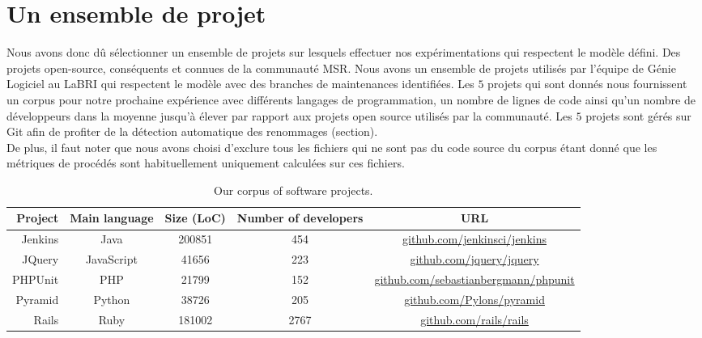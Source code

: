 \section{Un ensemble de projet}
\label{sec:ensemble_projet}
Nous avons donc dû sélectionner un ensemble de projets sur lesquels effectuer nos expérimentations qui respectent le modèle défini. Des projets open-source, conséquents et connues de la communauté MSR. Nous avons un ensemble de projets utilisés par l'équipe de Génie Logiciel au LaBRI qui respectent le modèle avec des branches de maintenances identifiées. Les $5$ projets qui sont donnés  nous fournissent un corpus pour notre prochaine expérience avec différents langages de programmation, un nombre de lignes de code ainsi qu'un nombre de développeurs dans la moyenne jusqu'à élever par rapport aux projets open source utilisés par la communauté. Les $5$ projets sont gérés sur Git afin de profiter de la détection automatique des renommages (section). \\
De plus, il faut noter que nous avons choisi d'exclure tous les fichiers qui ne sont pas du code source du corpus étant donné que les métriques de procédés sont habituellement uniquement calculées sur ces fichiers. \\

\begin{table*}[t]
\centering
\begin{tabular}{rcccc}
\toprule
Project & Main language & Size (LoC) & Number of developers & URL\\
\midrule
Jenkins & Java & 200851 & 454 & \url{github.com/jenkinsci/jenkins} \\
JQuery & JavaScript & 41656 & 223 & \url{github.com/jquery/jquery} \\
PHPUnit & PHP & 21799 & 152 & \url{github.com/sebastianbergmann/phpunit}\\
Pyramid & Python & 38726 & 205 & \url{github.com/Pylons/pyramid} \\
Rails & Ruby & 181002 & 2767 & \url{github.com/rails/rails}\\
\bottomrule
\end{tabular}
\caption{Our corpus of software projects.}
\label{tab:projects}
\end{table*}
